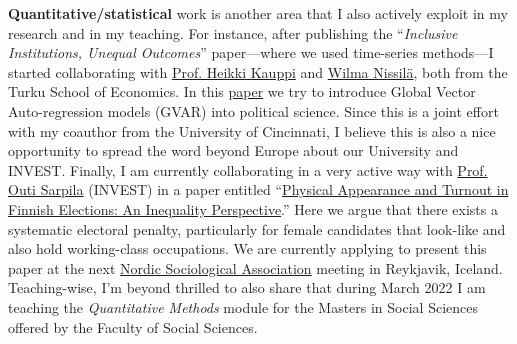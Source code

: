 \documentclass[10pt,stdletter,dateno,sigleft]{newlfm} %
\begin{document}
\begin{newlfm}
{\bf Quantitative/statistical} work is another area that I also actively exploit in my research and in my teaching. For instance, after publishing the ``\emph{Inclusive Institutions, Unequal Outcomes}'' paper---where we used time-series methods---I started collaborating with \href{https://www.utu.fi/en/people/heikki-kauppi}{Prof. Heikki Kauppi} and \href{https://www.utu.fi/en/people/wilma-nissila}{Wilma Nissil{\"a}}, both from the Turku School of Economics. In this \href{https://github.com/hbahamonde/Bahamonde_Kovac/raw/master/abstract.txt}{paper} we try to introduce Global Vector Auto-regression models (GVAR) into political science. Since this is a joint effort with my coauthor from the University of Cincinnati, I believe this is also a nice opportunity to spread the word beyond Europe about our University and INVEST. Finally, I am currently collaborating in a very active way with \href{https://www.utu.fi/en/people/outi-sarpila}{Prof. Outi Sarpila} (INVEST) in a paper entitled ``\href{https://raw.githubusercontent.com/hbahamonde/Physical/main/abstract.rtf}{Physical Appearance and Turnout in Finnish Elections: An Inequality Perspective}.'' Here we argue that there exists a systematic electoral penalty, particularly for female candidates that look-like and also hold working-class occupations. We are currently applying to present this paper at the next \href{https://nsa2022.is}{Nordic Sociological Association} meeting in Reykjavik, Iceland. Teaching-wise, I'm beyond thrilled to also share that during March 2022 I am teaching the \emph{Quantitative Methods} module for the Masters in Social Sciences offered by the Faculty of Social Sciences. 


\end{newlfm}
\end{document}
